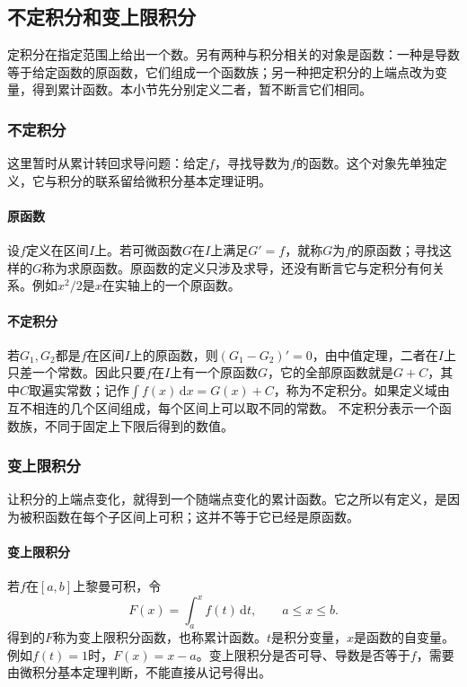 \subsection{不定积分和变上限积分}
\label{sec:analysis-definite-indefinite-integrals}

定积分在指定范围上给出一个数。另有两种与积分相关的对象是函数：一种是导数等于给定函数的原函数，它们组成一个函数族；另一种把定积分的上端点改为变量，得到累计函数。本小节先分别定义二者，暂不断言它们相同。

\subsubsection{不定积分}

这里暂时从累计转回求导问题：给定$f$，寻找导数为$f$的函数。这个对象先单独定义，它与积分的联系留给微积分基本定理证明。


\paragraph{原函数}
设$f$定义在区间$I$上。若可微函数$G$在$I$上满足$G'=f$，就称$G$为$f$的原函数；寻找这样的$G$称为求原函数。原函数的定义只涉及求导，还没有断言它与定积分有何关系。例如$x^2/2$是$x$在实轴上的一个原函数。

\paragraph{不定积分}
若$G_1,G_2$都是$f$在区间$I$上的原函数，则$(G_1-G_2)'=0$，由中值定理，二者在$I$上只差一个常数。因此只要$f$在$I$上有一个原函数$G$，它的全部原函数就是$G+C$，其中$C$取遍实常数；记作$\int f(x)\,\mathrm dx=G(x)+C$，称为不定积分。如果定义域由互不相连的几个区间组成，每个区间上可以取不同的常数。
不定积分表示一个函数族，不同于固定上下限后得到的数值。

\subsubsection{变上限积分}

让积分的上端点变化，就得到一个随端点变化的累计函数。它之所以有定义，是因为被积函数在每个子区间上可积；这并不等于它已经是原函数。


\paragraph{变上限积分}
若$f$在$[a,b]$上黎曼可积，令
\[
 F(x)=\int_a^xf(t)\,\mathrm dt,\qquad a\leq x\leq b.
\]
得到的$F$称为变上限积分函数，也称累计函数。$t$是积分变量，$x$是函数的自变量。例如$f(t)=1$时，$F(x)=x-a$。变上限积分是否可导、导数是否等于$f$，需要由微积分基本定理判断，不能直接从记号得出。

